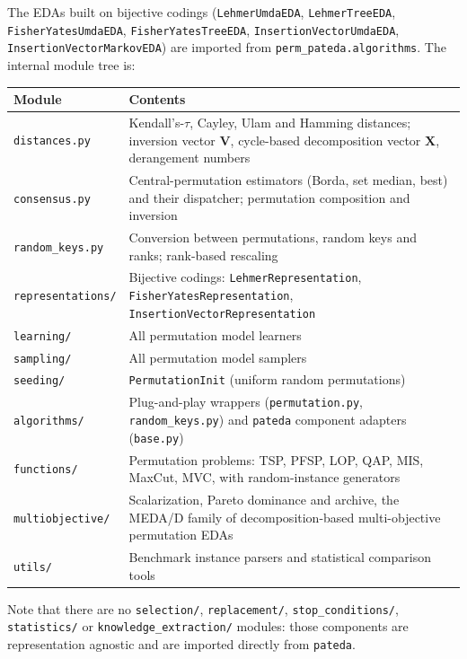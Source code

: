 \documentclass[a4paper,11pt]{article}
\begin{document}
\noindent The EDAs built on bijective codings
(\texttt{LehmerUmdaEDA}, \texttt{LehmerTreeEDA}, \texttt{FisherYatesUmdaEDA},
\texttt{FisherYatesTreeEDA}, \texttt{InsertionVectorUmdaEDA},
\texttt{InsertionVectorMarkovEDA}) are imported from
\texttt{perm\_pateda.algorithms}.  The internal module tree is:

\begin{center}
\begin{tabular}{lp{9.2cm}}
\toprule
\textbf{Module} & \textbf{Contents} \\
\midrule
\texttt{distances.py} & Kendall's-$\tau$, Cayley, Ulam and Hamming distances;
  inversion vector $\mathbf{V}$, cycle-based decomposition vector $\mathbf{X}$,
  derangement numbers \\
\texttt{consensus.py} & Central-permutation estimators (Borda, set median,
  best) and their dispatcher; permutation composition and inversion \\
\texttt{random\_keys.py} & Conversion between permutations, random keys and
  ranks; rank-based rescaling \\
\texttt{representations/} & Bijective codings: \texttt{LehmerRepresentation},
  \texttt{FisherYatesRepresentation}, \texttt{InsertionVectorRepresentation} \\
\texttt{learning/} & All permutation model learners \\
\texttt{sampling/} & All permutation model samplers \\
\texttt{seeding/} & \texttt{PermutationInit} (uniform random permutations) \\
\texttt{algorithms/} & Plug-and-play wrappers (\texttt{permutation.py},
  \texttt{random\_keys.py}) and \texttt{pateda} component adapters
  (\texttt{base.py}) \\
\texttt{functions/} & Permutation problems: TSP, PFSP, LOP, QAP, MIS, MaxCut,
  MVC, with random-instance generators \\
\texttt{multiobjective/} & Scalarization, Pareto dominance and archive, the
  MEDA/D family of decomposition-based multi-objective permutation EDAs \\
\texttt{utils/} & Benchmark instance parsers and statistical comparison tools \\
\bottomrule
\end{tabular}
\end{center}

Note that there are no \texttt{selection/}, \texttt{replacement/},
\texttt{stop\_conditions/}, \texttt{statistics/} or
\texttt{knowledge\_extraction/} modules: those components are representation
agnostic and are imported directly from \texttt{pateda}.
\end{document}
